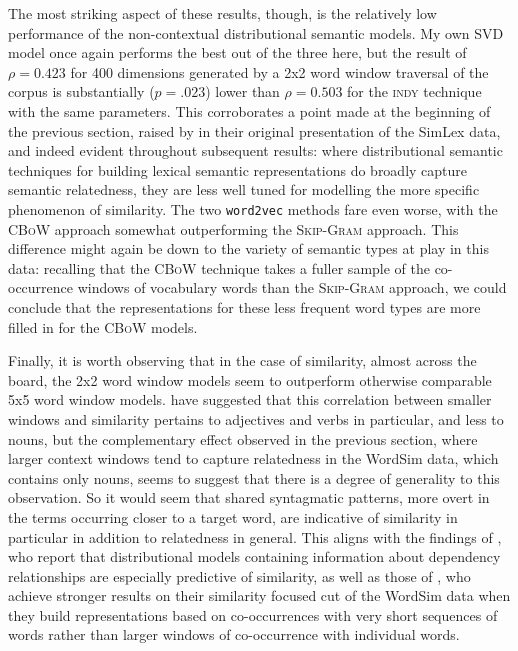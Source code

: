 The most striking aspect of these results, though, is the relatively low performance of the non-contextual distributional semantic models.  My own SVD model once again performs the best out of the three here, but the result of $\rho = 0.423$ for 400 dimensions generated by a 2x2 word window traversal of the corpus is substantially ($p = .023$) lower than $\rho = 0.503$ for the \textsc{indy} technique with the same parameters.  This corroborates a point made at the beginning of the previous section, raised by \cite{HillEA2015} in their original presentation of the SimLex data, and indeed evident throughout subsequent results: where distributional semantic techniques for building lexical semantic representations do broadly capture semantic relatedness, they are less well tuned for modelling the more specific phenomenon of similarity.  The two \texttt{word2vec} methods fare even worse, with the \textsc{CBoW} approach somewhat outperforming the \textsc{Skip-Gram} approach.  This difference might again be down to the variety of semantic types at play in this data: recalling that the \textsc{CBoW} technique takes a fuller sample of the co-occurrence windows of vocabulary words than the \textsc{Skip-Gram} approach, we could conclude that the representations for these less frequent word types are more filled in for the \textsc{CBoW} models.

Finally, it is worth observing that in the case of similarity, almost across the board, the 2x2 word window models seem to outperform otherwise comparable 5x5 word window models.  \cite{HillEA2015} have suggested that this correlation between smaller windows and similarity pertains to adjectives and verbs in particular, and less to nouns, but the complementary effect observed in the previous section, where larger context windows tend to capture relatedness in the WordSim data, which contains only nouns, seems to suggest that there is a degree of generality to this observation.  So it would seem that shared syntagmatic patterns, more overt in the terms occurring closer to a target word, are indicative of similarity in particular in addition to relatedness in general.  This aligns with the findings of \cite{KielaEA2014}, who report that distributional models containing information about dependency relationships are especially predictive of similarity, as well as those of \cite{AgirreEA2009}, who achieve stronger results on their similarity focused cut of the WordSim data when they build representations based on co-occurrences with very short sequences of words rather than larger windows of co-occurrence with individual words.

